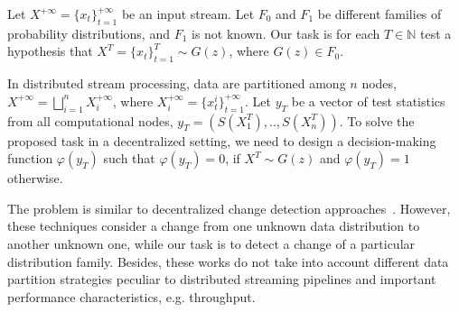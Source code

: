 \label {fs-short-model}

Let $X^{+\infty}=\{x_t\}_{t=1}^{+\infty}$ be an input stream. Let $F_0$ and $F_1$ be different families of probability distributions, and $F_1$ is not known. Our task is for each $T\in \mathbb{N}$ test a hypothesis that $X^T=\{x_t\}_{t=1}^{T} \sim G(z)$, where $G(z) \in F_0$.

In distributed stream processing, data are partitioned among $n$ nodes, $X^{+\infty}=\bigsqcup_{i=1}^n X_i^{+\infty}$, where $X_i^{+\infty}=\{x_t^i\}_{t=1}^{+\infty}$. Let $y_T$ be a vector of test statistics from all computational nodes,  $y_T = (S(X_1^T),..,S(X_n^T))$. To solve the proposed task in a decentralized setting, we need to design a decision-making function $\varphi(y_T)$ such that $\varphi(y_T) = 0$, if $X^T \sim G(z)$  and $\varphi(y_T) = 1$ otherwise.

The problem is similar to decentralized change detection approaches~\cite{tartakovsky2008asymptotically, tran2014change}. However, these techniques consider a change from one unknown data distribution to another unknown one, while our task is to detect a change of a particular distribution family. Besides, these works do not take into account different data partition strategies peculiar to distributed streaming pipelines and important performance characteristics, e.g. throughput.